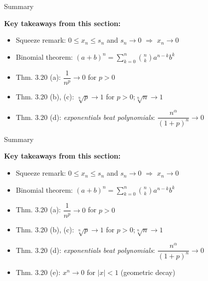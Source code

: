 \documentclass[aspectratio=169,12pt,t]{beamer}
\begin{document}
{%
\begin{frame}{Summary}
  \begin{hlbox}
    \textbf{Key takeaways from this section:}
    \begin{itemize}
      \item \alert{Squeeze remark:} $0 \leq x_n \leq s_n$ and $s_n \to 0$ $\Longrightarrow$ $x_n \to 0$
      \item \alert{Binomial theorem:} $(a+b)^n = \sum_{k=0}^{n} \binom{n}{k} a^{n-k} b^k$
      \item \alert{Thm. 3.20 (a):} $\dfrac{1}{n^p} \to 0$ for $p > 0$
      \item \alert{Thm. 3.20 (b), (c):} $\sqrt[n]{p} \to 1$ for $p > 0$;\quad $\sqrt[n]{n} \to 1$
      \item \alert{Thm. 3.20 (d):} \emph{exponentials beat polynomials}: $\dfrac{n^\alpha}{(1+p)^n} \to 0$
    \end{itemize}
  \end{hlbox}

\end{frame}

\begin{frame}{Summary}
  \begin{hlbox}
    \textbf{Key takeaways from this section:}
    \begin{itemize}
      \item \alert{Squeeze remark:} $0 \leq x_n \leq s_n$ and $s_n \to 0$ $\Longrightarrow$ $x_n \to 0$
      \item \alert{Binomial theorem:} $(a+b)^n = \sum_{k=0}^{n} \binom{n}{k} a^{n-k} b^k$
      \item \alert{Thm. 3.20 (a):} $\dfrac{1}{n^p} \to 0$ for $p > 0$
      \item \alert{Thm. 3.20 (b), (c):} $\sqrt[n]{p} \to 1$ for $p > 0$;\quad $\sqrt[n]{n} \to 1$
      \item \alert{Thm. 3.20 (d):} \emph{exponentials beat polynomials}: $\dfrac{n^\alpha}{(1+p)^n} \to 0$
      \item \alert{Thm. 3.20 (e):} $x^n \to 0$ for $|x| < 1$ (geometric decay)
    \end{itemize}
  \end{hlbox}


\end{frame}}
\end{document}
